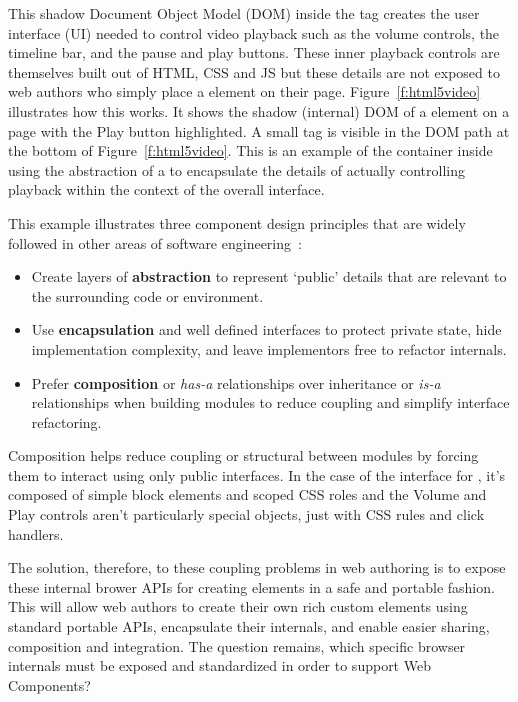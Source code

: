 This shadow Document Object Model (DOM) inside the 
 tag creates the user interface (UI) needed to control video playback such as the volume controls, the timeline bar, and the pause and play buttons.
These inner playback controls are themselves built out of HTML, CSS and JS but these details are not exposed to web authors who simply place a  element on their page. 
Figure~\ref{f:html5video} illustrates how this works. It shows the shadow (internal) DOM of a  element on a page with the Play button  highlighted.
A small  tag is visible in the DOM path at the bottom of Figure~\ref{f:html5video}.
This is an example of the container inside  using the abstraction of a  to encapsulate the details of actually controlling playback within the context of the overall  interface.

This example illustrates three component design principles that are widely followed in other areas of software engineering~\cite{fowler2012}:
\begin{itemize}
\item Create layers of \textbf{abstraction} to represent `public' details that are relevant to the surrounding code or environment.
\item Use \textbf{encapsulation} and well defined interfaces to protect private state, hide implementation complexity, and leave implementors free to refactor internals.
\item Prefer \textbf{composition} or \textit{has-a} relationships over inheritance or \textit{is-a} relationships when building modules to reduce coupling and simplify interface refactoring.
\end{itemize}

Composition helps reduce coupling or structural between modules by forcing them to interact using only public interfaces.
In the case of the interface for , it's composed of simple block elements and scoped CSS roles and the Volume and Play controls aren't particularly special objects, just  with CSS rules and click handlers.

The solution, therefore, to these coupling problems in web authoring is to expose these internal brower APIs for creating elements in a safe and portable fashion. 
This will allow web authors to create their own rich custom elements using standard portable APIs, encapsulate their internals, and enable easier sharing, composition and integration.
The question remains, which specific browser internals must be exposed and standardized in order to support Web Components?

